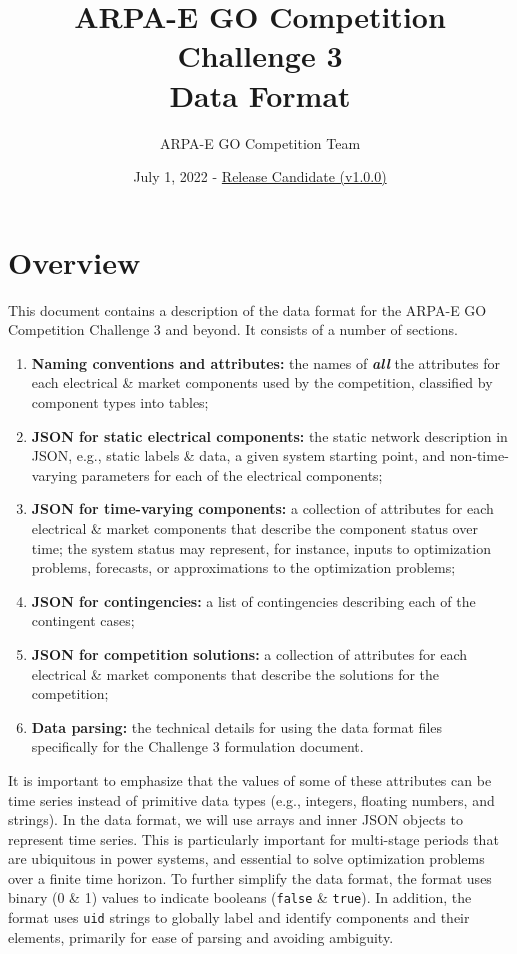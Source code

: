 \documentclass{article}
\title{ARPA-E GO Competition Challenge 3 \\ Data Format}
\author{ARPA-E GO Competition Team}
\date{July 1, 2022 - \underline{Release Candidate (v1.0.0)}}
\begin{document}
\maketitle





\section{Overview}

This document contains a description of the data format for the ARPA-E GO Competition Challenge 3 and beyond. It consists of a number of sections.
\begin{enumerate}[I]
    \item {\bf Naming conventions and attributes:} the names of \textit{\textbf{all}} the attributes for each electrical \& market components used by the competition, classified by component types into tables;

    \item {\bf JSON for static electrical components:} the static network description in JSON, e.g., static labels \& data, a given system starting point, and non-time-varying parameters for each of the electrical components;

    \item {\bf JSON for time-varying components:} a collection of attributes for each electrical \& market components that describe the component status over time; the system status may represent, for instance, inputs to optimization problems,  forecasts, or approximations to the optimization problems;
    \item {\bf JSON for contingencies:} a list of contingencies describing each of the contingent cases;
    \item {\bf JSON for competition solutions:} a collection of attributes for each electrical \& market components that describe the solutions for the competition;
     \item {\bf Data parsing:}
     the technical details for using the data format files specifically for the Challenge 3 formulation document.
\end{enumerate}
It is important to emphasize that the values of some of these attributes can be time series instead of primitive data types (e.g., integers, floating numbers, and strings).
In the data format, we will use arrays and inner JSON objects to represent time series.
This is particularly important for multi-stage periods that are ubiquitous in power systems, and essential
to solve optimization problems over a finite time horizon.
To further simplify the data format, the format uses binary (0 \& 1) values to indicate booleans (\texttt{false} \& \texttt{true}).
In addition, the format uses \texttt{uid} strings to globally label and identify components and their elements, primarily for ease of parsing and avoiding ambiguity. 
\end{document}
